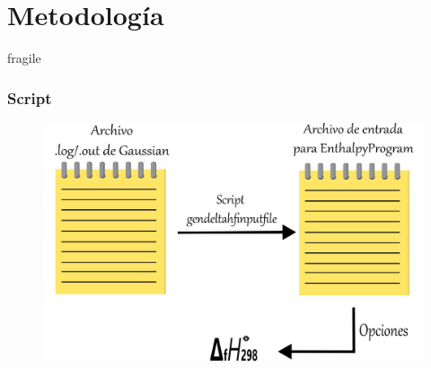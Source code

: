 \documentclass{beamer}
\begin{document}
\section{Metodología}
\begin{frame}{fragile}
\frametitle{Script}
\begin{figure}
\includegraphics[scale=.35]{images/script}
\end{figure}
\end{frame}
\end{document}
